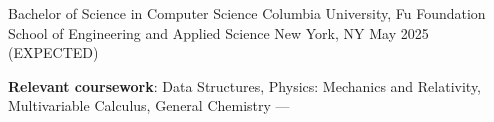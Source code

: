 
\begin{cventries}
  \cventry
  {Bachelor of Science in Computer Science} %
  {Columbia University, Fu Foundation School of Engineering and Applied Science} %
  {New York, NY} %
  {May 2025 (EXPECTED)} %
  {
    \begin{cvitems} %
      \item {\textbf{Relevant coursework}: Data Structures, Physics: Mechanics and Relativity, Multivariable Calculus, General Chemistry --- }
    \end{cvitems}
  }
\end{cventries}

